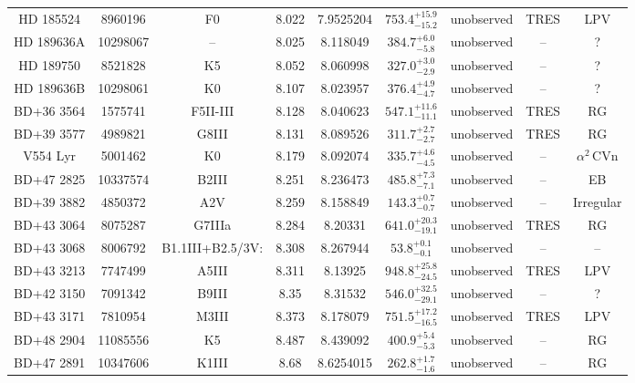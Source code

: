 \begin{table*}
\begin{tabular}{ccccccccc}
HD 185524 & 8960196 & F0 & 8.022 & 7.9525204 & $753.4^{+15.9}_{-15.2}$ & unobserved & TRES & LPV \\
HD 189636A & 10298067 & -- & 8.025 & 8.118049 & $384.7^{+6.0}_{-5.8}$ & unobserved & -- & ? \\
HD 189750 & 8521828 & K5 & 8.052 & 8.060998 & $327.0^{+3.0}_{-2.9}$ & unobserved & -- & ? \\
HD 189636B & 10298061 & K0 & 8.107 & 8.023957 & $376.4^{+4.9}_{-4.7}$ & unobserved & -- & ? \\
BD+36 3564 & 1575741 & F5II-III & 8.128 & 8.040623 & $547.1^{+11.6}_{-11.1}$ & unobserved & TRES & RG \\
BD+39 3577 & 4989821 & G8III & 8.131 & 8.089526 & $311.7^{+2.7}_{-2.7}$ & unobserved & TRES & RG \\
V554 Lyr & 5001462 & K0 & 8.179 & 8.092074 & $335.7^{+4.6}_{-4.5}$ & unobserved & -- & $\alpha^2\,\text{CVn}$ \\
BD+47 2825 & 10337574 & B2III & 8.251 & 8.236473 & $485.8^{+7.3}_{-7.1}$ & unobserved & -- & EB \\
BD+39 3882 & 4850372 & A2V & 8.259 & 8.158849 & $143.3^{+0.7}_{-0.7}$ & unobserved & -- & Irregular \\
BD+43 3064 & 8075287 & G7IIIa & 8.284 & 8.20331 & $641.0^{+20.3}_{-19.1}$ & unobserved & TRES & RG \\
BD+43 3068 & 8006792 & B1.1III+B2.5/3V: & 8.308 & 8.267944 & $53.8^{+0.1}_{-0.1}$ & unobserved & -- & -- \\
BD+43 3213 & 7747499 & A5III & 8.311 & 8.13925 & $948.8^{+25.8}_{-24.5}$ & unobserved & TRES & LPV \\
BD+42 3150 & 7091342 & B9III & 8.35 & 8.31532 & $546.0^{+32.5}_{-29.1}$ & unobserved & -- & ? \\
BD+43 3171 & 7810954 & M3III & 8.373 & 8.178079 & $751.5^{+17.2}_{-16.5}$ & unobserved & TRES & LPV \\
BD+48 2904 & 11085556 & K5 & 8.487 & 8.439092 & $400.9^{+5.4}_{-5.3}$ & unobserved & -- & RG \\
BD+47 2891 & 10347606 & K1III & 8.68 & 8.6254015 & $262.8^{+1.7}_{-1.6}$ & unobserved & -- & RG \\
\hline
\end{tabular}
\end{table*}
